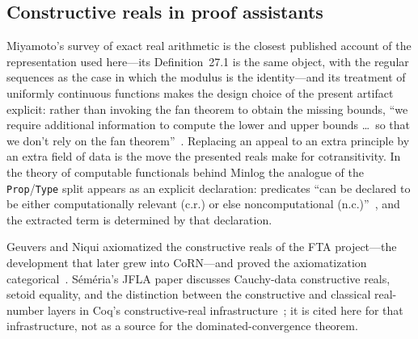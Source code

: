 \documentclass[11pt]{article}
\theoremstyle{definition}
\theoremstyle{remark}
\begin{document}
\subsection*{Constructive reals in proof assistants}
Miyamoto's survey of exact real arithmetic is the closest published account of the representation used here---its Definition~27.1 is the same object, with the regular sequences as the case in which the modulus is the identity---and its treatment of uniformly continuous functions makes the design choice of the present artifact explicit: rather than invoking the fan theorem to obtain the missing bounds, ``we require additional information to compute the lower and upper bounds \ldots\ so that we don't rely on the fan theorem''~\cite[\S27.2.1, Def.~27.13]{miyamoto-2023}.  Replacing an appeal to an extra principle by an extra field of data is the move the presented reals make for cotransitivity.  In the theory of computable functionals behind Minlog the analogue of the \texttt{Prop}/\texttt{Type} split appears as an explicit declaration: predicates ``can be declared to be either computationally relevant (c.r.) or else noncomputational (n.c.)''~\cite[\S26.3]{schwichtenberg-2023}, and the extracted term is determined by that declaration.

Geuvers and Niqui axiomatized the constructive reals of the FTA project---the development that later grew into CoRN---and proved the axiomatization categorical~\cite{geuvers-niqui-2002}.  S\'em\'eria's JFLA paper discusses Cauchy-data constructive reals, setoid equality, and the distinction between the constructive and classical real-number layers in Coq's constructive-real infrastructure~\cite{semeria-2020-reals}; it is cited here for that infrastructure, not as a source for the dominated-convergence theorem.
\end{document}
